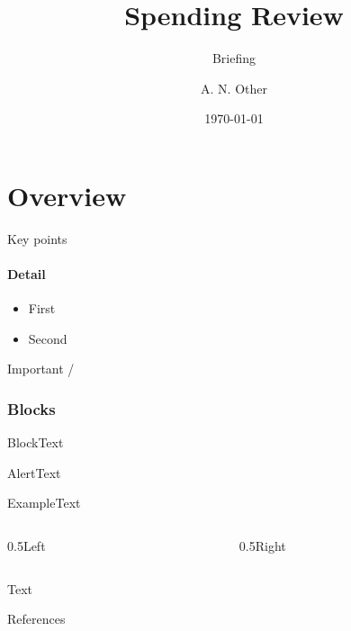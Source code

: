 \documentclass{beamer}
\title[Short]{Spending Review}
\subtitle{Briefing}
\author{A. N. Other}
\institute{Cabinet Office}
\date{\today}
\begin{document}
\begin{frame}
  \titlepage
\end{frame}
\section{Overview}
\begin{frame}{Key points}
  \framesubtitle{Detail}
  \begin{itemize}
    \item<1-> First \pause
    \item<2-> Second
  \end{itemize}
    
   \alert{Important} 
   
  \insertframenumber/\inserttotalframenumber
\end{frame}
\begin{frame}[fragile]
  \frametitle{Blocks}
  \begin{block}{Block}Text\end{block}
  \begin{alertblock}{Alert}Text\end{alertblock}
  \begin{exampleblock}{Example}Text\end{exampleblock}
  \begin{columns}[T]
    \begin{column}{0.5\textwidth}Left\end{column}
    \begin{column}{0.5\textwidth}Right\end{column}
  \end{columns}
  \begin{overprint}
    Text
  \end{overprint}
\end{frame}
\appendix
\begin{frame}[allowframebreaks]{References}
  \beamertemplatenavigationsymbolsempty
\end{frame}
\end{document}
